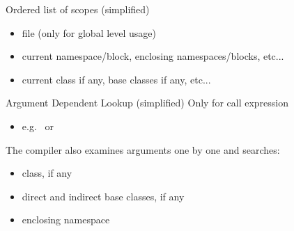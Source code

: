 \begin{frame}
  \begin{block}{Ordered list of scopes (simplified)}
    \begin{itemize}
    \item file (only for global level usage)
    \item current namespace/block, enclosing namespaces/blocks, etc...
    \item current class if any, base classes if any, etc...
    \end{itemize}
  \end{block}
  \begin{exampleblock}{Argument Dependent Lookup (simplified)}
    Only for call expression
    \begin{itemize}
    \item e.g.\  or 
    \end{itemize}
    The compiler also examines arguments one by one and searches:
    \begin{itemize}
    \item class, if any
    \item direct and indirect base classes, if any
    \item enclosing namespace
    \end{itemize}
  \end{exampleblock}
\end{frame}


